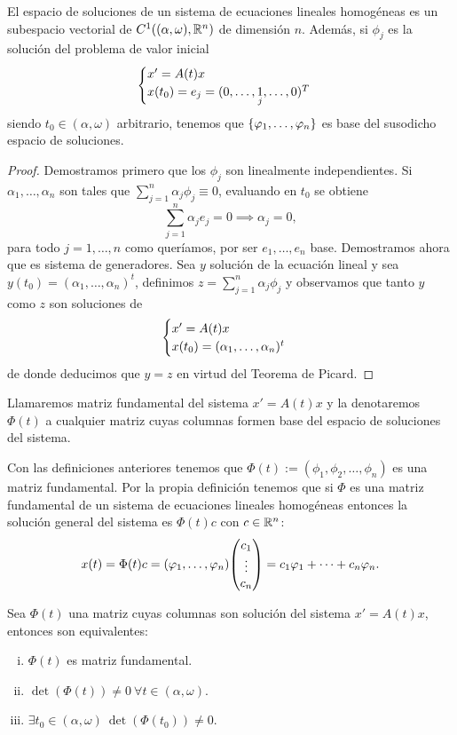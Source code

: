 \documentclass[../ecuaciones_diferenciales.tex]{subfiles}
\begin{document}
\begin{theorem}
	El espacio de soluciones de un sistema de ecuaciones lineales homogéneas es
	un subespacio vectorial de \(C^1((\alpha, \omega), \mathbb{R}^n)\) de dimensión
	\(n\). Además, si \(\phi_j\) es la solución del problema de valor inicial
	\[\begin{cases}
			x' = A(t)x \\
			x(t_0) = e_j = (0, \dots, \underset{j}{1}, \dots, 0)^T\end{cases}\]
	siendo \(t_0 \in (\alpha, \omega)\) arbitrario, tenemos que
	\(\set{\phi_1, \dots, \phi_n}\) es base del susodicho espacio de soluciones.
\end{theorem}

\begin{proof}
	Demostramos primero que los \(\phi_j\) son linealmente independientes. Si
	\(\alpha_1, \dots, \alpha_n\) son tales que \(\sum_{j = 1}^n \alpha_j \phi_j
	\equiv 0\), evaluando en \(t_0\) se obtiene
	\[\sum_{j = 1}^n \alpha_j e_j = 0 \implies \alpha_j = 0,\]
	para todo \(j = 1, \dots, n\) como queríamos, por ser \(e_1, \dots,
	e_n\) base. Demostramos ahora que es sistema de generadores. Sea \(y\) solución
	de la ecuación lineal y sea \(y(t_0) = (\alpha_1, \dots, \alpha_n)^t\),
	definimos \(z = \sum_{j = 1}^n \alpha_j \phi_j\) y observamos que tanto
	\(y\) como \(z\) son soluciones de
	\[\begin{cases}
			x' = A(t)x \\
			x(t_0) = (\alpha_1, \dots, \alpha_n)^t\end{cases}\]
	de donde deducimos que \(y = z\) en virtud del Teorema de Picard.
\end{proof}

\begin{definition}
	Llamaremos matriz fundamental del sistema \(x' = A(t)x\) y la denotaremos
	\(\Phi(t)\) a cualquier matriz cuyas columnas formen base del espacio de
	soluciones del sistema.
\end{definition}

Con las definiciones anteriores tenemos que
\(\Phi(t) := (\phi_1, \phi_2, \dots, \phi_n)\) es una matriz fundamental. Por la
propia definición tenemos que si \(\Phi\) es una matriz fundamental de un
sistema de ecuaciones lineales homogéneas entonces la solución general del
sistema es \(\Phi(t)c\) con \(c \in \mathbb{R}^n\):
\[x(t) = \Phi(t) c = (\phi_1, \dots, \phi_n) \mat{c_1 \\ \vdots \\ c_n} =
	c_1\phi_1 + \cdots + c_n\phi_n.\]

\begin{corollary}
	Sea \(\Phi(t)\) una matriz cuyas columnas son solución del sistema
	\(x' = A(t)x\), entonces son equivalentes:

	\begin{enumerate}[i)]
		\item \(\Phi(t)\) es matriz fundamental.

		\item \(\det(\Phi(t)) \neq 0 \ \forall t \in (\alpha, \omega)\).

		\item \(\exists t_0 \in (\alpha, \omega) \ \det(\Phi(t_0)) \neq 0\).
	\end{enumerate}
\end{corollary}
\end{document}
